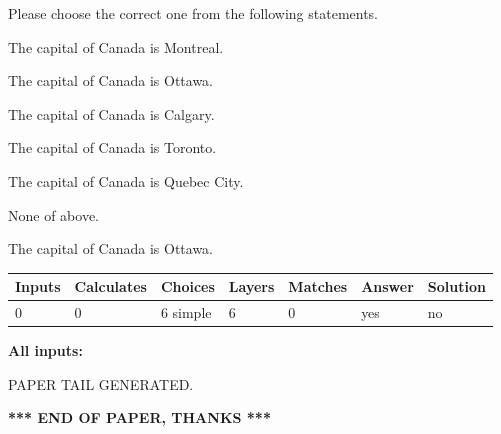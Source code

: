 \documentclass[12pt]{article}
\begin{document}
  
Please choose the correct one from the following statements.
 
 
The capital of Canada is Montreal.
 
 
The capital of Canada is Ottawa.
 
 
The capital of Canada is Calgary.
 
 
The capital of Canada is Toronto.
 
 
The capital of Canada is Quebec City.
 
 
 None of above.
 
 
\noindent{}
 
 
The capital of Canada is Ottawa.
 
 
\noindent{}
 
 
   
   
   
   
\noindent\begin{tabular}{|l|l|l|l|l|l|l|}
 \hline
Inputs & Calculates & Choices & Layers & Matches & Answer & Solution \\ \hline
 0  & 
 0  & 
 6
  simple  
  & 
 6  & 
 0  & 
  yes & 
  no 
  \\ \hline
 \end{tabular}
   
   
   
   
\noindent{}
   
   
   
   
\noindent\vspace{0.1in}\hspace{-0.08in} {\textbf{\Large{All inputs: }}}
   
   
   
   
   
   
 \vspace{0.2in}
 
   
   
\vspace{2.0in} PAPER TAIL GENERATED.
   
   
   
   
\vspace{1.0in} 
{\textbf{\large{ *** END OF PAPER, THANKS *** }}} 
   
\end{document}
